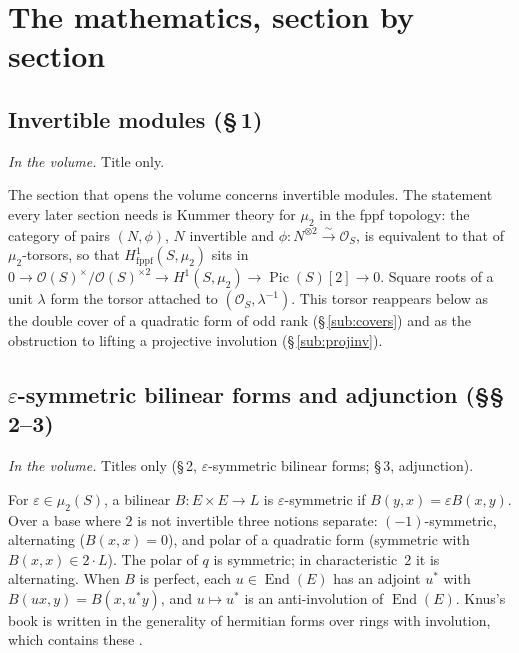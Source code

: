 \documentclass[11pt,a4paper]{amsart}
\newcommand{\cO}{\mathcal{O}}
\newcommand{\End}{\operatorname{End}}
\newcommand{\status}[1]{\par\smallskip\noindent\textit{In the volume.} #1\par\smallskip}
\theoremstyle{plain}
\theoremstyle{definition}
\begin{document}
\section{The mathematics, section by section}\label{sec:math}

\subsection{Invertible modules (\S\,1)}
\status{Title only.}
The section that opens the volume concerns invertible modules. The statement every later section needs is Kummer theory for $\mu_2$ in the fppf topology: the category of pairs $(N,\phi)$, $N$ invertible and $\phi\colon N^{\otimes2}\xrightarrow{\sim}\cO_S$, is equivalent to that of $\mu_2$-torsors, so that $H^1_{\mathrm{fppf}}(S,\mu_2)$ sits in $0\to\cO(S)^\times/\cO(S)^{\times2}\to H^1(S,\mu_2)\to\operatorname{Pic}(S)[2]\to0$. Square roots of a unit $\lambda$ form the torsor attached to $(\cO_S,\lambda^{-1})$. This torsor reappears below as the double cover of a quadratic form of odd rank (\S\,\ref{sub:covers}) and as the obstruction to lifting a projective involution (\S\,\ref{sub:projinv}).

\subsection{$\varepsilon$-symmetric bilinear forms and adjunction (\S\S\,2--3)}
\status{Titles only (\S\,2, $\varepsilon$-symmetric bilinear forms; \S\,3, adjunction).}
For $\varepsilon\in\mu_2(S)$, a bilinear $B\colon E\times E\to L$ is $\varepsilon$-symmetric if $B(y,x)=\varepsilon B(x,y)$. Over a base where $2$ is not invertible three notions separate: $(-1)$-symmetric, alternating ($B(x,x)=0$), and polar of a quadratic form (symmetric with $B(x,x)\in 2\cdot L$). The polar of $q$ is symmetric; in characteristic~$2$ it is alternating. When $B$ is perfect, each $u\in\End(E)$ has an adjoint $u^*$ with $B(ux,y)=B(x,u^*y)$, and $u\mapsto u^*$ is an anti-involution of $\End(E)$. Knus's book is written in the generality of hermitian forms over rings with involution, which contains these \cite{knus}.
\end{document}
